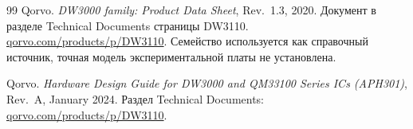 \documentclass{misisarticle}
\begin{document}
\begin{thebibliography}{99}
Qorvo. \textit{DW3000 family: Product Data Sheet}, Rev.~1.3, 2020.
Документ в разделе Technical Documents страницы DW3110.
\href{https://www.qorvo.com/products/p/DW3110}{qorvo.com/products/p/DW3110}.
Семейство используется как справочный источник, точная модель экспериментальной платы не установлена.

Qorvo. \textit{Hardware Design Guide for DW3000 and QM33100 Series ICs (APH301)}, Rev.~A, January 2024.
Раздел Technical Documents:
\href{https://www.qorvo.com/products/p/DW3110}{qorvo.com/products/p/DW3110}.

\end{thebibliography}
\end{document}
